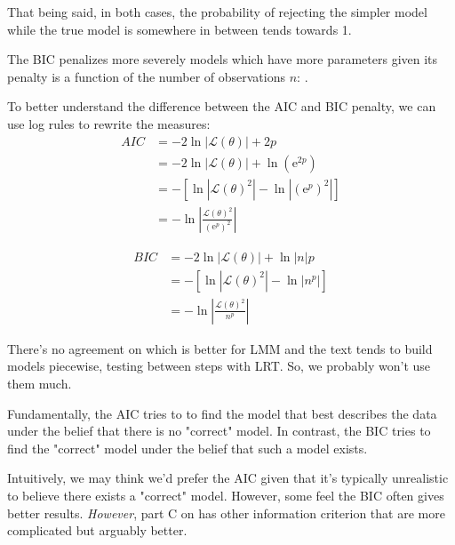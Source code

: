 \documentclass[english]{article}
\begin{document}
\begin{multicols*}{2}
\begin{rappel_enhanced}[Context]
\bigskip

That being said, in both cases, the probability of rejecting the simpler model while the true model is somewhere in between tends towards 1.
\end{rappel_enhanced}


\begin{definitionNOHFILLsub}
The BIC penalizes more severely models which have more parameters given its penalty is a function of the number of observations $n$: .
\end{definitionNOHFILLsub}

\bigskip

To better understand the difference between the AIC and BIC penalty, we can use log rules to rewrite the measures:
\begin{align*}
	AIC	
	&=	-2\ln|\mathcal{L}(\theta)| + 2p	\\
	&=	-2\ln|\mathcal{L}(\theta)| + \ln\left(\textrm{e}^{2p}\right)	\\
	&=	-\left[\ln|\mathcal{L}(\theta)^{2}| - \ln\left|\left(\textrm{e}^{p}\right)^{2}\right|\right]	\\
	&=	-\ln\left|\frac{\mathcal{L}(\theta)^{2}}{\left(\textrm{e}^{p}\right)^{2}}\right|	
\end{align*}

\begin{align*}
	BIC
	&=	-2\ln|\mathcal{L}(\theta)| + \ln|n|p	\\
	&=	-\left[\ln\left|\mathcal{L}(\theta)^{2}\right| - \ln\left|n^{p}\right|\right]	\\
	&=	-\ln\left|\frac{\mathcal{L}(\theta)^{2}}{n^{p}}\right|	
\end{align*}

\bigskip

\begin{rappel_enhanced}[Context]
There's no agreement on which is better for LMM and the text tends to build models piecewise, testing between steps with LRT. So, we probably won't use them much.

\bigskip

Fundamentally, the AIC tries to to find the model that best describes the data under the belief that there is no "correct" model. In contrast, the BIC tries to find the "correct" model under the belief that such a model exists. 

\bigskip

Intuitively, we may think we'd prefer the AIC given that it's typically unrealistic to believe there exists a "correct" model. However, some feel the BIC often gives better results. \textit{However}, part C on \textit{\underline{}} has other information criterion that are more complicated but arguably better. 
\end{rappel_enhanced}



\end{multicols*}
\end{document}
